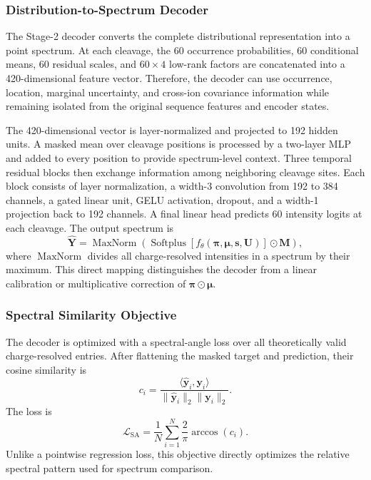 \subsubsection{Distribution-to-Spectrum Decoder}
\label{sec:spectrum_decoder}

The Stage-2 decoder converts the complete distributional representation into
a point spectrum. At each cleavage, the 60 occurrence probabilities, 60
conditional means, 60 residual scales, and $60\times4$ low-rank factors are
concatenated into a 420-dimensional feature vector. Therefore, the decoder can
use occurrence, location, marginal uncertainty, and cross-ion covariance
information while remaining isolated from the original sequence features and
encoder states.

The 420-dimensional vector is layer-normalized and projected to 192 hidden
units. A masked mean over cleavage positions is processed by a two-layer MLP
and added to every position to provide spectrum-level context. Three temporal
residual blocks then exchange information among neighboring cleavage sites.
Each block consists of layer normalization, a width-3 convolution from 192 to
384 channels, a gated linear unit, GELU activation, dropout, and a width-1
projection back to 192 channels. A final linear head predicts 60 intensity
logits at each cleavage. The output spectrum is
\begin{equation}
    \widehat{\mathbf{Y}}
    = \operatorname{MaxNorm}\!\left(
        \operatorname{Softplus}\!\left[
        f_{\theta}(\boldsymbol{\pi},\boldsymbol{\mu},\mathbf{s},\mathbf{U})
        \right]\odot\mathbf{M}
      \right),
    \label{eq:decoder_prediction}
\end{equation}
where $\operatorname{MaxNorm}$ divides all charge-resolved intensities in a
spectrum by their maximum. This direct mapping distinguishes the decoder from
a linear calibration or multiplicative correction of
$\boldsymbol{\pi}\odot\boldsymbol{\mu}$.

\subsubsection{Spectral Similarity Objective}
\label{sec:spectral_similarity}

The decoder is optimized with a spectral-angle loss over all theoretically
valid charge-resolved entries. After flattening the masked target and
prediction, their cosine similarity is
\begin{equation}
    c_i =
    \frac{\langle\widehat{\mathbf{y}}_i,\mathbf{y}_i\rangle}
    {\|\widehat{\mathbf{y}}_i\|_2\|\mathbf{y}_i\|_2}.
\end{equation}
The loss is
\begin{equation}
    \mathcal{L}_{\mathrm{SA}}
    = \frac{1}{N}\sum_{i=1}^{N}
      \frac{2}{\pi}\arccos(c_i).
    \label{eq:sa_loss}
\end{equation}
Unlike a pointwise regression loss, this objective directly optimizes the
relative spectral pattern used for spectrum comparison.

